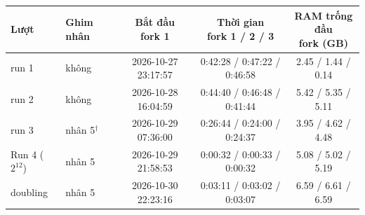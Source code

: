 \begin{tabular}{llccc}
\toprule
Lượt & Ghim nhân & \makecell{Bắt đầu \\ fork 1} & \makecell{Thời gian \\ fork 1 / 2 / 3} & \makecell{RAM trống đầu \\ fork (GB)} \\
\midrule
run 1 & không & 2026-10-27 23:17:57 & 0:42:28 / 0:47:22 / 0:46:58 & 2.45 / 1.44 / 0.14 \\
run 2 & không & 2026-10-28 16:04:59 & 0:44:40 / 0:46:48 / 0:41:44 & 5.42 / 5.35 / 5.11 \\
run 3 & nhân 5$^{\dagger}$ & 2026-10-29 07:36:00 & 0:26:44 / 0:24:00 / 0:24:37 & 3.95 / 4.62 / 4.48 \\
Run 4 ($2^{12}$) & nhân 5 & 2026-10-29 21:58:53 & 0:00:32 / 0:00:33 / 0:00:32 & 5.08 / 5.02 / 5.19 \\
doubling & nhân 5 & 2026-10-30 22:23:16 & 0:03:11 / 0:03:02 / 0:03:07 & 6.59 / 6.61 / 6.59 \\
\bottomrule
\end{tabular}
